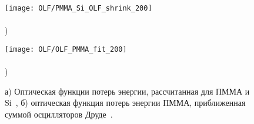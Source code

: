 \begin{figure}[t]
	\begin{minipage}{0.5\textwidth}
		\texttt{[image: OLF/PMMA\_Si\_OLF\_shrink\_200]} \\
		\vspace{-12.5em} \\ ) \\ \vspace{12.5em}
	\end{minipage}
	\begin{minipage}{0.5\textwidth}
		\texttt{[image: OLF/OLF\_PMMA\_fit\_200]} \\
		\vspace{-12.5em} \\ ) \\ \vspace{12.5em}
	\end{minipage}
	\vspace{-3.5em}
	\caption{а) Оптическая функции потерь энергии, рассчитанная для ПММА и Si~\cite{Palik, Ritchie_ELF}, б) оптическая функция потерь энергии ПММА, приближенная суммой осцилляторов Друде~\cite{Dapor_2015_oscillators}.}
	\label{fig:OLF}
\end{figure}


